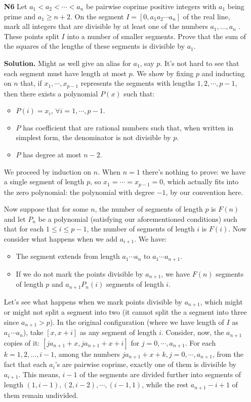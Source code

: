 \documentclass[11pt,a4paper]{article}
\begin{document}
\begin{enumerate}
	\item[\textbf{N6}] Let $a_1 < a_2 <  \cdots <a_n$ be pairwise coprime positive integers with $a_1$ being prime and $a_1 \ge n + 2$. On the segment $I = [0, a_1 a_2  \cdots a_n ]$ of the real line, mark all integers that are divisible by at least one of the numbers $a_1 ,   \ldots , a_n$ . These points split $I$ into a number of smaller segments. Prove that the sum of the squares of the lengths of these segments is divisible by $a_1$.
	
	\textbf{Solution.} Might as well give an alias for $a_1$, say $p$. 
	It's not hard to see that each segment must have length at most $p$. We show by fixing $p$ and inducting on $n$ that, if $x_1, \cdots , x_{p-1}$ represents the segments with lengths $1, 2, \cdots , p-1$, then there exists a polynomial $P(x)$ such that: 
	\begin{itemize}
		\item $P(i)=x_i$, $\forall i=1, \cdots , p-1$. 
		\item $P$ has coefficient that are rational numbers such that, when written in simplest form, the denominator is not divisible by $p$. 
		\item $P$ has degree at most $n-2$. 
	\end{itemize}
	We proceed by induction on $n$. When $n=1$ there's nothing to prove: we have a single segment of length $p$, so $x_1=\cdots =x_{p-1}=0$, which actually fits into the zero polynomial: the polynomial with degree $-1$, by our convention here. 
	
	Now suppose that for some $n$, the number of segments of length $p$ is $F(n)$ and let $P_n$ be a polynomial (satisfying our aforementioned conditions) such that for each $1\le i\le p-1$, the number of segments of length $i$ is $F(i)$. Now consider what happens when we add $a_{i+1}$. We have: 
	\begin{itemize}
		\item The segment extends from length $a_1\cdots a_n$ to $a_1\cdots a_{n+1}$. 
		
		\item If we do not mark the points divisible by $a_{n+1}$, we have $F(n)$ segments of length $p$ and $a_{n+1}P_n(i)$ segments of length $i$. 
	\end{itemize}
	Let's see what happens when we mark points divisible by $a_{n+1}$, which might or might not split a segment into two (it cannot split the a segment into three since $a_{n+1}>p$). 
	In the original configuration (where we have length of $I$ as $a_1\cdots a_n$), take $[x, x+i]$ as any segment of length $i$. 
	Consider, now, the $a_{n+1}$ copies of it: $[ja_{n+1}+x, ja_{n+1}+x+i]$ for $j=0, \cdots , a_{n+1}$. 
	For each $k=1, 2, \dots , i-1$, among the numbers $ja_{n+1}+x+k, j=0, \cdots , a_{n+1}$, from the fact that each $a_i$'s are pairwise coprime, exactly one of them is divisible by $a_{i+1}$. This means, $i-1$ of the segments are divided further into segments of length $(1, i-1), (2, i-2), \cdots , (i-1, 1)$, while the rest $a_{n+1}-i+1$ of them remain undivided. 
	

\end{enumerate}
\end{document}

